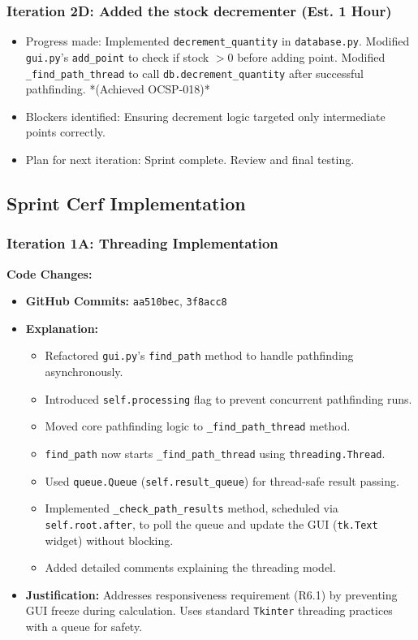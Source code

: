 \subsubsection{Iteration 2D: Added the stock decrementer (Est. 1 Hour)}
\begin{itemize}
	\item Progress made: Implemented \verb|decrement_quantity| in \verb|database.py|. Modified \verb|gui.py|'s \verb|add_point| to check if stock $> 0$ before adding point. Modified \verb|_find_path_thread| to call \verb|db.decrement_quantity| after successful pathfinding. *(Achieved OCSP-018)*
	\item Blockers identified: Ensuring decrement logic targeted only intermediate points correctly.
	\item Plan for next iteration: Sprint complete. Review and final testing.
\end{itemize}

\clearpage
\subsection{Sprint Cerf Implementation}

\subsubsection{Iteration 1A: Threading Implementation}

\textbf{Code Changes:}
\begin{itemize}
	\item \textbf{GitHub Commits:} \verb|aa510bec|, \verb|3f8acc8|
	\item \textbf{Explanation:}
	\begin{itemize}
		\item Refactored \verb|gui.py|'s \verb|find_path| method to handle pathfinding asynchronously.
		\item Introduced \verb|self.processing| flag to prevent concurrent pathfinding runs.
		\item Moved core pathfinding logic to \verb|_find_path_thread| method.
		\item \verb|find_path| now starts \verb|_find_path_thread| using \verb|threading.Thread|.
		\item Used \verb|queue.Queue| (\verb|self.result_queue|) for thread-safe result passing.
		\item Implemented \verb|_check_path_results| method, scheduled via \verb|self.root.after|, to poll the queue and update the GUI (\verb|tk.Text| widget) without blocking.
		\item Added detailed comments explaining the threading model.
	\end{itemize}
	\item \textbf{Justification:} Addresses responsiveness requirement (R6.1) by preventing GUI freeze during calculation. Uses standard \verb|Tkinter| threading practices with a queue for safety.
\end{itemize}

